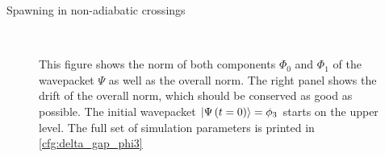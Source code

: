 \begin{chapter}{Spawning in non-adiabatic crossings}
\begin{figure}[h!]
  \centering
   \\
  \caption[Norms and norm drift for a $\phi_3$ in an avoided crossing]{
  This figure shows the norm of both components $\Phi_0$ and $\Phi_1$ of the
  wavepacket $\Psi$ as well as the overall norm. The right panel shows the drift
  of the overall norm, which should be conserved as good as possible.
  The initial wavepacket $\Ket{\Psi\left( t=0 \right)} = \phi_3$ starts on the upper level.
  The full set of simulation parameters is printed in \ref{cfg:delta_gap_phi3}
  \label{fig:basic_delta_gap_phi3_norms}
  }
\end{figure}



\end{chapter}
